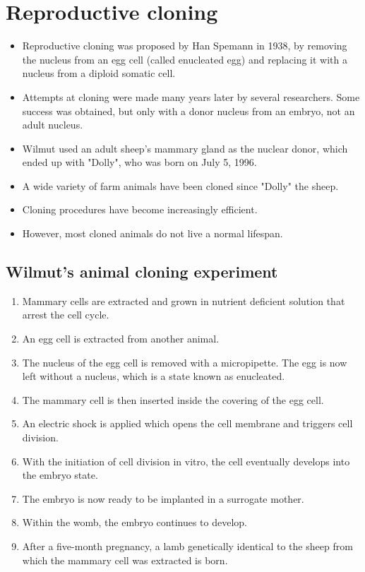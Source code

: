 \documentclass[11pt]{article}
\begin{document}
\section{Reproductive cloning}
\label{sec:orge6073e5}
\begin{itemize}
\item Reproductive cloning was proposed by Han Spemann in 1938, by removing the nucleus from an egg cell (called enucleated egg) and replacing it with a nucleus from a diploid somatic cell.
\item Attempts at cloning were made many years later by several researchers. Some success was obtained, but only with a donor nucleus from an embryo, not an adult nucleus.
\item Wilmut used an adult sheep's mammary gland as the nuclear donor, which ended up with "Dolly", who was born on July 5, 1996.
\item A wide variety of farm animals have been cloned since "Dolly" the sheep.
\item Cloning procedures have become increasingly efficient.
\item However, most cloned animals do not live a normal lifespan.
\end{itemize}
\subsection{Wilmut's animal cloning experiment}
\label{sec:org93227e4}
\begin{enumerate}
\item Mammary cells are extracted and grown in nutrient deficient solution that arrest the cell cycle.
\item An egg cell is extracted from another animal.
\item The nucleus of the egg cell is removed with a micropipette. The egg is now left without a nucleus, which is a state known as enucleated.
\item The mammary cell is then inserted inside the covering of the egg cell.
\item An electric shock is applied which opens the cell membrane and triggers cell division.
\item With the initiation of cell division in vitro, the cell eventually develops into the embryo state.
\item The embryo is now ready to be implanted in a surrogate mother.
\item Within the womb, the embryo continues to develop.
\item After a five-month pregnancy, a lamb genetically identical to the sheep from which the mammary cell was extracted is born.
\end{enumerate}
\end{document}
